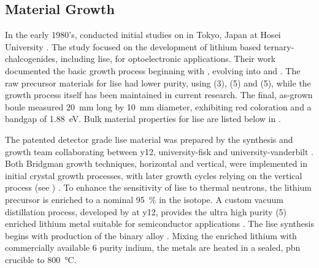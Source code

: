 \documentclass[../../../main.tex]{subfiles}
\begin{document}
%
    \subsection{Material Growth}%
    \label{sec:chapter-2:lise:material-growth}%
    In the early 1980's, \citeauthor*{Kamijoh_1981a} conducted initial studies on  in Tokyo, Japan at Hosei University \cite{Kamijoh_1981a}. 
    The study focused on the development of lithium based \glspl{ternary-chalcogenide}, including \gls{lise}, for optoelectronic applications.
    Their work documented the basic growth process beginning with , evolving into  and  \cite{Kamijoh_1979, Kamijoh_1981, Kuriyama_1981}.
    The raw precursor materials for \gls{lise} had lower purity, using  (\SI{3}{\nines}),  (\SI{5}{\nines}) and  (\SI{5}{\nines}), while the growth process itself has been maintained in current research.
    The final, as-grown boule measured \SI{20}{\milli\meter} long by \SI{10}{\milli\meter} diameter, exhibiting red coloration and a bandgap of \SI{1.88}{\electronvolt}.
    Bulk material properties for \gls{lise} are listed below in .
    \par%
    The patented detector grade \gls{lise} material was prepared by the synthesis and growth team collaborating between \gls{y12}, \gls{university-fisk} and \gls{university-vanderbilt} \cite{patent:Bell_2010,Tupitsyn_2012}. 
    Both Bridgman growth techniques, horizontal and vertical, were implemented in initial crystal growth processes, with later growth cycles relying on the vertical process (see ) \cite{Stowe_2013, Stowe_2013a}.
    To enhance the sensitivity of \gls{lise} to thermal neutrons, the lithium precursor is enriched to a nominal \SI{95}{\percent} in the  isotope.
    A custom vacuum distillation process, developed by \citeauthor*{Stowe_2011} at \gls{y12}, provides the ultra high purity (\SI{5}{\nines}) enriched lithium metal suitable for semiconductor applications \cite{Stowe_2011}.
    The \gls{lise} synthesis begins with production of the binary alloy .
    Mixing the enriched lithium with commercially available \SI{6}{\nines} purity indium, the metals are heated in a sealed, \gls{pbn} crucible to \SI{800}{\celsius}.
\end{document}
